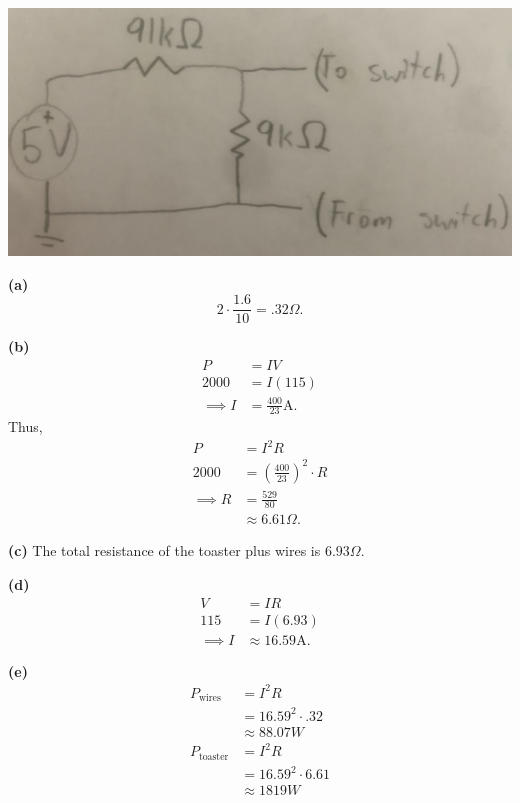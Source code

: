 \documentclass{article}
\begin{document}
\bigskip
{}

    \begin{center}
    \includegraphics[scale=.1]{switch_circuit.jpg}
    \end{center}

\bigskip
{}

{\bf (a)} $$2\cdot\frac{1.6}{10}=.32\Omega.$$

\medskip
{\bf (b)}
\begin{align*}
    P &= IV \\
    2000 &= I(115) \\
    \implies I &= \frac{400}{23}\text{A}.
\end{align*}
Thus,
\begin{align*}
    P &= I^2R \\
    2000 &= \left(\frac{400}{23}\right)^2 \cdot R \\
    \implies R &= \frac{529}{80} \\
    &\approx 6.61\Omega.
\end{align*}

\medskip
{\bf (c)} The total resistance of the toaster plus wires is $6.93\Omega$.

\medskip
{\bf (d)}
\begin{align*}
    V &= IR \\
    115 &= I(6.93) \\
    \implies I &\approx 16.59\text{A}.
\end{align*}

\medskip
{\bf (e)}
\begin{align*}
    P_{\text{wires}} &= I^2R \\
                     &= 16.59^2 \cdot .32 \\
                     &\approx 88.07W \\
    P_{\text{toaster}} &= I^2R \\
                       &= 16.59^2 \cdot 6.61 \\
                       &\approx 1819W
\end{align*}
\end{document}
